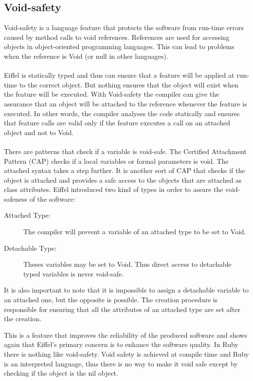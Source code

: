 \documentclass[12pt,a4paper,twocolumn]{article}
\begin{document}
\subsection{Void-safety}
Void-safety is a language feature that protects the software from run-time errors caused by method calls to void references. References are used for accessing objects in object-oriented programming languages. This can lead to problems when the reference is Void (or null in other languages).
\\
\\
Eiffel is statically typed and thus can ensure that a feature will be applied at run-time to the correct object. But nothing ensures that the object will exist when the feature will be executed. With Void-safety the compiler can give the assurance that an object will be attached to the reference whenever the feature is executed. In other words, the compiler analyses the code statically and ensures that feature calls are valid only if the feature executes a call on an attached object and not to Void.
\\
\\
There are patterns that check if a variable is void-safe. The Certified Attachment Pattern (CAP) checks if a local variables or formal parameters is void. The attached syntax takes a step further. It is another sort of CAP that checks if the object is attached and provides a safe access to the objects that are attached as class attributes. Eiffel introduced two kind of types in order to assure the void-safeness of the software:
\begin{description}
\item[Attached Type: ] The compiler will prevent a variable of an attached type to be set to Void.
\item[Detachable Type: ] Theses variables may be set to Void. Thus direct access to detachable typed variables is never void-safe.%
\end{description}
It is also important to note that it is impossible to assign a detachable variable to an attached one, but the opposite is possible. The creation procedure is responsible for ensuring that all the attributes of an attached type are set after the creation. 

This is a feature that improves the reliability of the produced software and shows again that Eiffel's primary concern is to enhance the software quality. In Ruby there is nothing like void-safety. Void safety is achieved at compile time and Ruby is an interpreted language, thus there is no way to make it void safe except by checking if the object is the nil object.
\end{document}
